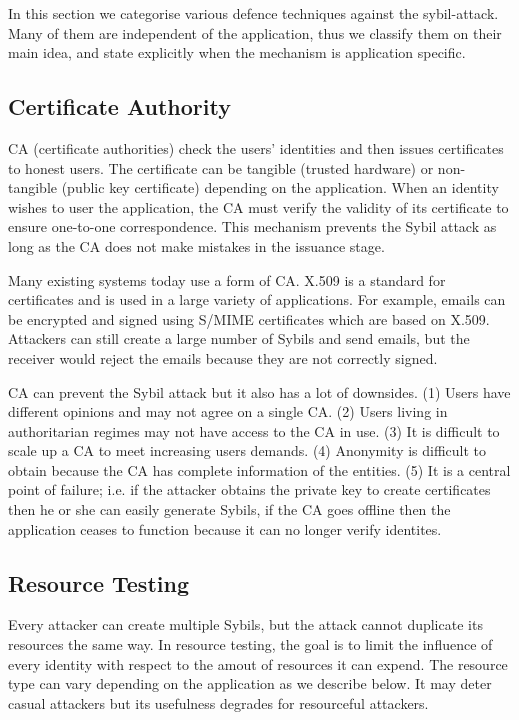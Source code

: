 In this section we categorise various defence techniques against the
sybil-attack. Many of them are independent of the application, thus we classify
them on their main idea, and state explicitly when the mechanism is application
specific.

\subsection{Certificate Authority}\label{sec:cert-authority}

CA (certificate authorities) check the users' identities and then issues
certificates to honest users. The certificate can be tangible (trusted
hardware\cite{newsome2004sybil}) or non-tangible (public key certificate)
depending on the application. When an identity wishes to user the application,
the CA must verify the validity of its certificate to ensure one-to-one
correspondence. This mechanism prevents the Sybil attack as long as the CA does
not make mistakes in the issuance stage.

Many existing systems today use a form of CA. X.509\cite{housley2002internet} is
a standard for certificates and is used in a large variety of applications. For
example, emails can be encrypted and signed using
S/MIME\cite{ramsdell2010secure} certificates which are based on X.509. Attackers
can still create a large number of Sybils and send emails, but the receiver
would reject the emails because they are not correctly signed.

CA can prevent the Sybil attack but it also has a lot of downsides. (1) Users
have different opinions and may not agree on a single CA. (2) Users living in
authoritarian regimes may not have access to the CA in use. (3) It is difficult
to scale up a CA to meet increasing users demands. (4) Anonymity is difficult to
obtain because the CA has complete information of the entities. (5) It is a
central point of failure; i.e. if the attacker obtains the private key to create
certificates then he or she can easily generate Sybils, if the CA goes offline
then the application ceases to function because it can no longer verify
identites.


\subsection{Resource Testing}\label{sec:resource-testing}
Every attacker can create multiple Sybils, but the attack cannot duplicate its
resources the same way. In resource testing, the goal is to limit the influence
of every identity with respect to the amout of resources it can expend. The
resource type can vary depending on the application as we describe below. It may
deter casual attackers but its usefulness degrades for resourceful attackers.

